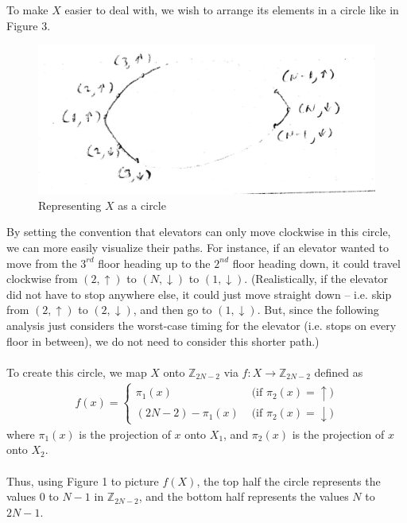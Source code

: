 \documentclass[letterpaper]{article} %
\begin{document}
To make $X$ easier to deal with, we wish to arrange its elements in a circle like in Figure 3.
\begin{figure}
  \centering
    \includegraphics[scale=0.2]{circle}
  \caption{Representing $X$ as a circle}
\end{figure}
By setting the convention that elevators can only move clockwise in this circle, we can more easily visualize their paths. For instance, if an elevator wanted to move from the $3^{rd}$ floor heading up to the $2^{nd}$ floor heading down, it could travel clockwise from $(2, \uparrow)$ to $(N, \downarrow)$ to $(1, \downarrow)$. (Realistically, if the elevator did not have to stop anywhere else, it could just move straight down -- i.e. skip from $(2, \uparrow)$ to $(2, \downarrow)$, and then go to $(1, \downarrow)$. But, since the following analysis just considers the worst-case timing for the elevator (i.e. stops on every floor in between), we do not need to consider this shorter path.)\\\\
To create this circle, we map $X$ onto $\mathbb{Z}_{2N - 2}$ via $f: X \rightarrow \mathbb{Z}_{2N - 2}$ defined as \\
\begin{align*}
    f(x)=\left\{
                \begin{array}{ll}
                  \pi_{1}(x) &\text{ (if $\pi_2(x) = \uparrow$)}\\
                  (2N - 2) - \pi_{1}(x) &\text{ (if $\pi_2(x) = \downarrow$)}
                \end{array}
              \right.
\end{align*}
where $\pi_{1}(x)$ is the projection of $x$ onto $X_1$, and $\pi_{2}(x)$ is the projection of $x$ onto $X_2$. \\\\
Thus, using Figure 1 to picture $f(X)$, the top half the circle represents the values $0$ to $N - 1$ in $\mathbb{Z}_{2N - 2}$, and the bottom half represents the values $N$ to $2N - 1$.
\end{document}
